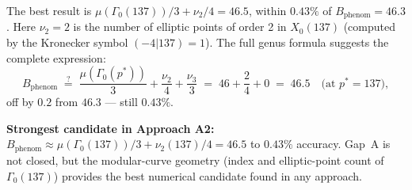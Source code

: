 \documentclass[12pt,a4paper]{article}
\theoremstyle{definition}
\theoremstyle{remark}
\begin{document}
The best result is $\mu(\Gamma_0(137))/3 + \nu_2/4 = 46.5$, within $0.43\%$
of $B_{\mathrm{phenom}} = 46.3$.  Here $\nu_2 = 2$ is the number of elliptic
points of order 2 in $X_0(137)$ (computed by the Kronecker symbol $(-4|137) = 1$).
The full genus formula suggests the complete expression:
\begin{equation}
  B_{\mathrm{phenom}} \;\stackrel{?}{=}\;
  \frac{\mu(\Gamma_0(p^*))}{3} + \frac{\nu_2}{4} + \frac{\nu_3}{3}
  \;=\; 46 + \frac{2}{4} + 0 \;=\; 46.5
  \quad\text{(at $p^* = 137$)},
\end{equation}
off by $0.2$ from $46.3$ --- still $0.43\%$.

\begin{gapbox}
\textbf{Strongest candidate in Approach A2:}
$B_{\mathrm{phenom}} \approx \mu(\Gamma_0(137))/3 + \nu_2(137)/4 = 46.5$
to $0.43\%$ accuracy.  Gap~A is not closed, but the modular-curve geometry
(index and elliptic-point count of $\Gamma_0(137)$) provides the best
numerical candidate found in any approach.
\end{gapbox}

\ifdefined\INCLUDEMODE
\else
  
\end{document}
